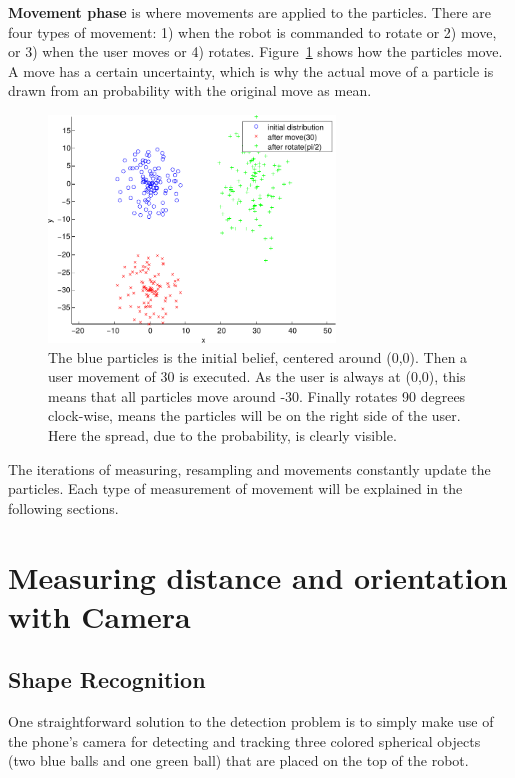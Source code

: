 \documentclass[journal]{IEEEtran}
\let\MYoriglatexcaption\caption
\renewcommand{\caption}[2][\relax]{\MYoriglatexcaption[#2]{#2}}
\begin{document}
\textbf{Movement phase} is where movements are applied to the particles. There
are four types of movement: 1) when the robot is commanded to rotate or 2) move,
or 3) when the user moves or 4) rotates. Figure~\ref{fig:particle-move} shows
how the particles move. A move has a certain uncertainty, which is why the
actual move of a particle is drawn from an probability with the original move
as mean.

\begin{figure}[!htpb]
 \centering
 \includegraphics[width=3in]{images/particle-move.pdf}
 \caption{The blue particles is the initial belief, centered around (0,0). Then
 a user movement of 30 is executed. As the user is always at (0,0), this means
that all particles move around -30. Finally rotates 90 degrees clock-wise,
means the particles will be on the right side of the user. Here the spread,
due to the probability, is clearly visible.}
 \label{fig:particle-move}
\end{figure}

The iterations of measuring, resampling and movements constantly update the
particles. Each type of measurement of movement will be explained in the
following sections.

\section{Measuring distance and orientation with Camera}

\subsection{Shape Recognition}

One straightforward solution to the detection problem is to simply make use of
the phone's camera for detecting and tracking three colored spherical objects
(two blue balls and one green ball) that are placed on the top of the robot.
\end{document}
